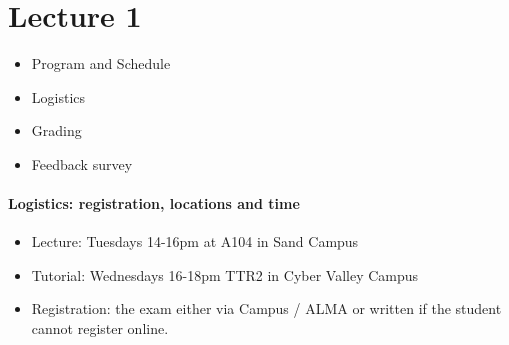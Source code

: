 
\section{Lecture 1}
\label{sec:L1}


  
 \begin{itemize}
 \item Program and Schedule
  \item Logistics
  \item Grading
  \item Feedback survey
 \end{itemize}
  
\paragraph{Logistics: registration, locations and time}
 \begin{itemize}
\item Lecture: Tuesdays 14-16pm at A104 in Sand Campus
\item Tutorial: Wednesdays 16-18pm TTR2 in Cyber Valley Campus
\item Registration:  the exam either via Campus / ALMA or written if the student cannot register online.
\end{itemize}
